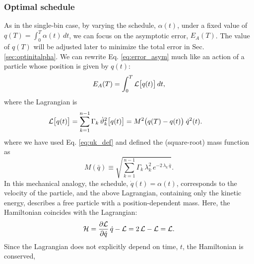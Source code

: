 \documentclass[reprint, superscriptaddress, floatfix]{revtex4-1}
\newcommand{\Err}{E}
\begin{document}
\subsubsection{\label{sec:optschedule}
Optimal schedule}



As in the single-bin case,
by varying the schedule, $\alpha(t)$, under a fixed value of
$q(T) = \int_0^T \alpha(t) \, dt$,
we can focus on the asymptotic error,
$\Err_A(T)$.
%
The value of $q(T)$ will be adjusted later
to minimize the total error in Sec. \ref{sec:optinitalpha}.
%
We can rewrite Eq. \eqref{eq:error_asym} much like an action
of a particle whose position is given by $q(t)$:
%
\begin{equation}
  \Err_A(T)
  =
  \int_0^T
    {\mathcal L} \bigl[ q(t)\bigr]
    \, dt
  ,
  \notag
\end{equation}
%
where the Lagrangian is
%
\begin{align}
  {\mathcal L} \bigl[ q(t) \bigr]
  &=
  \sum_{ k = 1 }^{n - 1}
    \Gamma_k \, {\dot \vartheta}_k^2\bigl[ q(t) \bigr]
  =
  M^2\bigl(q(T) - q(t) \bigr)
  \; \dot q^2( t )
  .
\notag
\end{align}
%
where we have
used Eq. \eqref{eq:uk_def} and
defined the (square-root) mass function as
%
\begin{equation}
  M(\bar q)
  \equiv
  \sqrt{
    \textstyle\sum_{ k = 1 }^{n - 1}
    \Gamma_k \, \lambda_k^2 \, e^{-2 \, \lambda_k \, \bar q}
  }
  .
  \label{eq:mass_func}
\end{equation}
%
In this mechanical analogy,
the schedule, $\dot q(t) = \alpha(t)$,
corresponds to the velocity of the particle,
%
and the above Lagrangian, containing only the kinetic energy,
describes a free particle
with a position-dependent mass.
%
Here, the Hamiltonian coincides with the Lagrangian:
%
\begin{equation}
  \mathcal H
  =
  \frac{ \partial \mathcal L }
       { \partial \dot q     }
  \, \dot q
  -
  \mathcal L
  =
  2 \, \mathcal L
  - \mathcal L
  =
  \mathcal L
  .
  \notag
\end{equation}
%
Since the Lagrangian
does not explicitly depend on time, $t$,
the Hamiltonian is conserved,\cite{goldstein, *landau_mechanics, *arnold}
\end{document}
